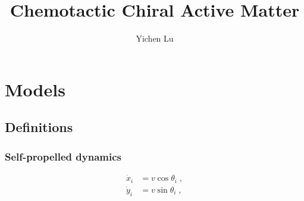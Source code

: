 \documentclass{article}
\title{\textbf{Chemotactic Chiral Active Matter}}
\author{Yichen Lu}
\begin{document}
\maketitle

\tableofcontents

\newpage
\section{Models}
\subsection{Definitions}
\subsubsection{Self-propelled dynamics}

\begin{subequations}
    \begin{align}
    \dot{x}_i&=v\cos \theta _i\;,
    \\
    \dot{y}_i&=v\sin \theta _i\;,
    \end{align}
    \label{eq:dotxy}
\end{subequations}
\end{document}
